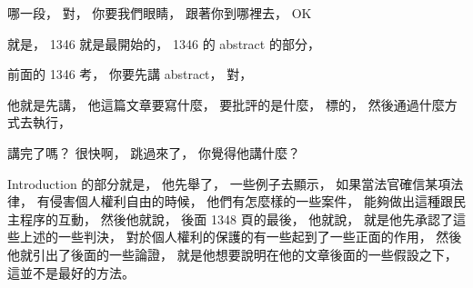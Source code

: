 \hypertarget{w06:cue:114}{}哪一段，
\hypertarget{w06:cue:115}{}對，
\hypertarget{w06:cue:116}{}你要我們眼睛，
\hypertarget{w06:cue:117}{}跟著你到哪裡去，
\hypertarget{w06:cue:118}{}OK

\hypertarget{w06:cue:119}{}就是，
\hypertarget{w06:cue:120}{}1346
\hypertarget{w06:cue:121}{}就是最開始的，
\hypertarget{w06:cue:122}{}1346 的 abstract 的部分，

\hypertarget{w06:cue:123}{}前面的 1346 考，
\hypertarget{w06:cue:124}{}你要先講 abstract，
\hypertarget{w06:cue:125}{}對，

\hypertarget{w06:cue:126}{}他就是先講，
\hypertarget{w06:cue:127}{}他這篇文章要寫什麼，
\hypertarget{w06:cue:128}{}要批評的是什麼，
\hypertarget{w06:cue:129}{}標的，
\hypertarget{w06:cue:130}{}然後通過什麼方式去執行，

\hypertarget{w06:cue:131}{}講完了嗎？
\hypertarget{w06:cue:132}{}很快啊，
\hypertarget{w06:cue:133}{}跳過來了，
\hypertarget{w06:cue:134}{}你覺得他講什麼？

\hypertarget{w06:cue:135}{}Introduction 的部分就是，
\hypertarget{w06:cue:136}{}他先舉了，
\hypertarget{w06:cue:137}{}一些例子去顯示，
\hypertarget{w06:cue:138}{}如果當法官確信某項法律，
\hypertarget{w06:cue:139}{}有侵害個人權利自由的時候，
\hypertarget{w06:cue:140}{}他們有怎麼樣的一些案件，
\hypertarget{w06:cue:141}{}能夠做出這種跟民主程序的互動，
\hypertarget{w06:cue:142}{}然後他就說，
\hypertarget{w06:cue:143}{}後面 1348 頁的最後，
\hypertarget{w06:cue:144}{}他就說，
\hypertarget{w06:cue:145}{}就是他先承認了這些上述的一些判決，
\hypertarget{w06:cue:146}{}對於個人權利的保護的有一些起到了一些正面的作用，
\hypertarget{w06:cue:147}{}然後他就引出了後面的一些論證，
\hypertarget{w06:cue:148}{}就是他想要說明在他的文章後面的一些假設之下，
\hypertarget{w06:cue:149}{}這並不是最好的方法。

